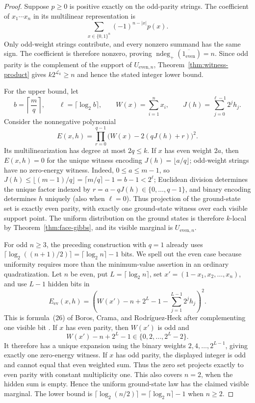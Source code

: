 \documentclass{article}
\newcommand{\LC}{\mathcal{L}}
\newcommand{\ndeg}{\operatorname{ndeg}}
\newcommand{\bits}{\{0,1\}}
\begin{document}
\begin{proof}
Suppose $p\ge0$ is positive exactly on the odd-parity strings.  The coefficient
of $x_1\cdots x_n$ in its multilinear representation is
\[
  \sum_{x\in\bits^n}(-1)^{n-|x|}p(x).
\]
Only odd-weight strings contribute, and every nonzero summand has the same
sign.  The coefficient is therefore nonzero, proving
$\ndeg_+(\overline{1_{\mathrm{even}}})=n$.  Since odd parity is the complement of the
support of $U_{\mathrm{even},n}$, Theorem~\ref{thm:witness-product} gives
$k2^{\LC_k}\ge n$ and hence the stated integer lower bound.

For the upper bound, let
\[
  b=\left\lceil\frac mq\right\rceil,
  \qquad \ell=\lceil\log_2 b\rceil,
  \qquad W(x)=\sum_{i=1}^n x_i,
  \qquad J(h)=\sum_{j=0}^{\ell-1}2^j h_j.
\]
Consider the nonnegative polynomial
\[
  E(x,h)=\prod_{r=0}^{q-1}
  \bigl(W(x)-2(qJ(h)+r)\bigr)^2.
\]
Its multilinearization has degree at most $2q\le k$.  If $x$ has even weight
$2a$, then $E(x,h)=0$ for the unique witness encoding
$J(h)=\lfloor a/q\rfloor$; odd-weight strings have no zero-energy witness.
Indeed, $0\le a\le m-1$, so
$J(h)\le\lfloor(m-1)/q\rfloor=\lceil m/q\rceil-1=b-1<2^\ell$;
Euclidean division determines the unique factor indexed by
$r=a-qJ(h)\in\{0,\ldots,q-1\}$, and binary encoding determines $h$ uniquely
(also when $\ell=0$).
Thus projection of the ground-state set is exactly even parity, with exactly
one ground-state witness over each visible support point.  The uniform
distribution on the ground states is therefore $k$-local by
Theorem~\ref{thm:face-gibbs}, and its visible marginal is
$U_{\mathrm{even},n}$.

For odd $n\ge3$, the preceding construction with $q=1$ already uses
$\lceil\log_2((n+1)/2)\rceil=\lceil\log_2 n\rceil-1$ bits.  We spell out the
even case because uniformity requires more than the minimum-value assertion in
an ordinary quadratization.  Let $n$ be even, put
$L=\lceil\log_2 n\rceil$, set
$x'=(1-x_1,x_2,\ldots,x_n)$, and use $L-1$ hidden bits in
\[
  E_{\mathrm{ev}}(x,h)
  =\left(
    W(x')-n+2^L-1-\sum_{j=1}^{L-1}2^j h_j
  \right)^2.
\]
This is formula~(26) of Boros, Crama, and Rodr\'iguez-Heck after complementing
one visible bit \cite[Theorem~11 and Remark~3]{bcrh20}.  If $x$ has even
parity, then $W(x')$ is odd and
\[
  W(x')-n+2^L-1\in\{0,2,\ldots,2^L-2\}.
\]
It therefore has a unique expansion using the binary weights
$2,4,\ldots,2^{L-1}$, giving exactly one zero-energy witness.  If $x$ has odd
parity, the displayed integer is odd and cannot equal that even weighted sum.
Thus the zero set projects exactly to even parity with constant multiplicity
one.  This also covers $n=2$, when the hidden sum is empty.  Hence the uniform
ground-state law has the claimed visible marginal.  The lower bound is
$\lceil\log_2(n/2)\rceil=\lceil\log_2 n\rceil-1$ when $n\ge2$.
\end{proof}
\end{document}

